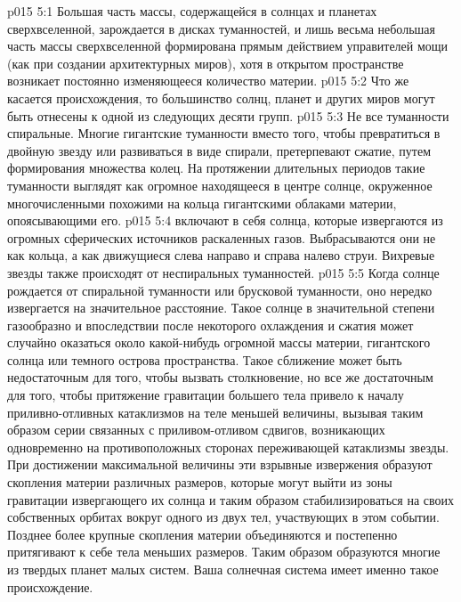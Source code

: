\vs p015 5:1 Большая часть массы, содержащейся в солнцах и планетах сверхвселенной, зарождается в дисках туманностей, и лишь весьма небольшая часть массы сверхвселенной формирована прямым действием управителей мощи (как при создании архитектурных миров), хотя в открытом пространстве возникает постоянно изменяющееся количество материи.
\vs p015 5:2 Что же касается происхождения, то большинство солнц, планет и других миров могут быть отнесены к одной из следующих десяти групп.
\vs p015 5:3 \bibnobreakspace {} Не все туманности спиральные. Многие гигантские туманности вместо того, чтобы превратиться в двойную звезду или развиваться в виде спирали, претерпевают сжатие, путем формирования множества колец. На протяжении длительных периодов такие туманности выглядят как огромное находящееся в центре солнце, окруженное многочисленными похожими на кольца гигантскими облаками материи, опоясывающими его.
\vs p015 5:4 \bibnobreakspace {} включают в себя солнца, которые извергаются из огромных сферических источников раскаленных газов. Выбрасываются они не как кольца, а как движущиеся слева направо и справа налево струи. Вихревые звезды также происходят от неспиральных туманностей.
\vs p015 5:5 \bibnobreakspace {} Когда солнце рождается от спиральной туманности или брусковой туманности, оно нередко извергается на значительное расстояние. Такое солнце в значительной степени газообразно и впоследствии после некоторого охлаждения и сжатия может случайно оказаться около какой\hyp{}нибудь огромной массы материи, гигантского солнца или темного острова пространства. Такое сближение может быть недостаточным для того, чтобы вызвать столкновение, но все же достаточным для того, чтобы притяжение гравитации большего тела привело к началу приливно\hyp{}отливных катаклизмов на теле меньшей величины, вызывая таким образом серии связанных с приливом\hyp{}отливом сдвигов, возникающих одновременно на противоположных сторонах переживающей катаклизмы звезды. При достижении максимальной величины эти взрывные извержения образуют скопления материи различных размеров, которые могут выйти из зоны гравитации извергающего их солнца и таким образом стабилизироваться на своих собственных орбитах вокруг одного из двух тел, участвующих в этом событии. Позднее более крупные скопления материи объединяются и постепенно притягивают к себе тела меньших размеров. Таким образом образуются многие из твердых планет малых систем. Ваша солнечная система имеет именно такое происхождение.
